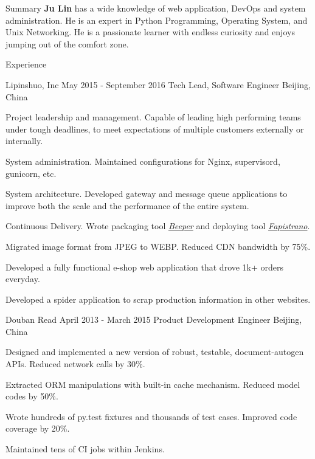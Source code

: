 \documentclass{resume}
\begin{document}
  \begin{rSection}{Summary}
    { {\bf Ju Lin } has a wide knowledge of web application, DevOps and system administration. He is an expert in Python Programming, Operating System, and Unix Networking. He is a passionate learner with endless curiosity and enjoys jumping out of the comfort zone. }
  \end{rSection}

  \begin{rSection}{Experience}

    \begin{rSubsection}{Lipinshuo, Inc}{ May 2015 - September 2016 }{Tech Lead, Software Engineer }{Beijing, China}
    \item Project leadership and management. Capable of leading high performing teams under tough deadlines, to meet expectations of multiple customers externally or internally.
    \item System administration. Maintained configurations for Nginx, supervisord, gunicorn, etc.
    \item System architecture. Developed gateway and message queue applications to improve both the scale and the performance of the entire system.
    \item Continuous Delivery. Wrote packaging tool \href{https://github.com/soasme/beeper.py}{\textit{Beeper}} and deploying tool \href{https://github.com/liwushuo/fapistrano}{\textit{Fapistrano}}.
    \item Migrated image format from JPEG to WEBP. Reduced CDN bandwidth by 75\%.
    \item Developed a fully functional e-shop web application that drove 1k+ orders everyday.
    \item Developed a spider application to scrap production information in other websites.
    \end{rSubsection}

    \begin{rSubsection}{ Douban Read }{ April 2013 - March 2015 }{ Product Development Engineer }{Beijing, China}
    \item Designed and implemented a new version of robust, testable, document-autogen APIs. Reduced network calls by 30\%.
    \item Extracted ORM manipulations with built-in cache mechanism. Reduced model codes by 50\%.
    \item Wrote hundreds of py.test fixtures and thousands of test cases. Improved code coverage by 20\%.
    \item Maintained tens of CI jobs within Jenkins.
    \end{rSubsection}


\end{rSection}
\end{document}
